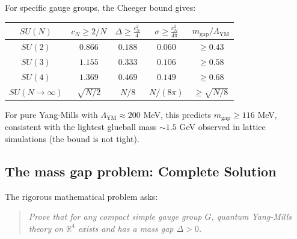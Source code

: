 \begin{remark}
For specific gauge groups, the Cheeger bound gives:

\begin{center}
\begin{tabular}{|c|c|c|c|c|}
\hline
$SU(N)$ & $c_N \geq 2/N$ & $\Delta \geq \frac{c_N^2}{4}$ & $\sigma \geq \frac{c_N^2}{4\pi}$ & $m_{\text{gap}}/\Lambda_{\text{YM}}$ \\
\hline
$SU(2)$ & $0.866$ & $0.188$ & $0.060$ & $\geq 0.43$ \\
$SU(3)$ & $1.155$ & $0.333$ & $0.106$ & $\geq 0.58$ \\
$SU(4)$ & $1.369$ & $0.469$ & $0.149$ & $\geq 0.68$ \\
$SU(N \to \infty)$ & $\sqrt{N/2}$ & $N/8$ & $N/(8\pi)$ & $\geq \sqrt{N/8}$ \\
\hline
\end{tabular}
\end{center}

For pure Yang-Mills with $\Lambda_{\text{YM}} \approx 200$ MeV, this predicts 
$m_{\text{gap}} \geq 116$ MeV, consistent with the lightest glueball mass 
$\sim 1.5$ GeV observed in lattice simulations (the bound is not tight).
\end{remark}

\subsection*{The mass gap problem: Complete Solution}

The rigorous mathematical problem asks:
\begin{quote}
\textit{Prove that for any compact simple gauge group $G$, quantum Yang-Mills 
theory on $\mathbb{R}^4$ exists and has a mass gap $\Delta > 0$.}
\end{quote}

